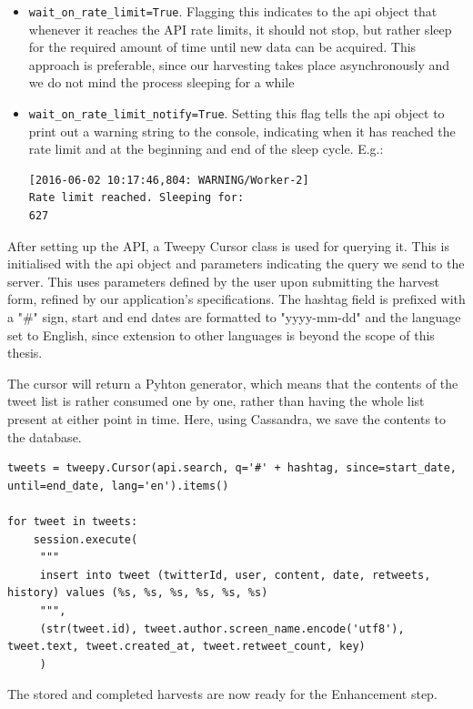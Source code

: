 \begin{itemize}
\item \texttt{wait\_on\_rate\_limit=True}. Flagging this indicates to the api object that whenever it reaches the API rate limits, it should not stop, but rather sleep for the required amount of time until new data can be acquired. This approach is preferable, since our harvesting takes place asynchronously and we do not mind the process sleeping for a while
\item \texttt{wait\_on\_rate\_limit\_notify=True}. Setting this flag tells the api object to print out a warning string to the console, indicating when it has reached the rate limit and at the beginning and end of the sleep cycle. E.g.:\lstset{basicstyle=\small}
\begin{lstlisting}
[2016-06-02 10:17:46,804: WARNING/Worker-2]
Rate limit reached. Sleeping for:
627
\end{lstlisting}
\end{itemize}

After setting up the API, a Tweepy Cursor class is used for querying it. This is initialised with the api object and parameters indicating the query we send to the server. This uses parameters defined by the user upon submitting the harvest form, refined by our application's specifications. The hashtag field is prefixed with a "\#" sign, start and end dates are formatted to "yyyy-mm-dd" and the language set to English, since extension to other languages is beyond the scope of this thesis.

The cursor will return a Pyhton generator, which means that the contents of the tweet list is rather consumed one by one, rather than having the whole list present at either point in time. Here, using Cassandra, we save the contents to the database.

\lstset{basicstyle=\small, breaklines=True}
\begin{lstlisting}
tweets = tweepy.Cursor(api.search, q='#' + hashtag, since=start_date, until=end_date, lang='en').items()

for tweet in tweets:
    session.execute(
     """
     insert into tweet (twitterId, user, content, date, retweets, history) values (%s, %s, %s, %s, %s, %s)
     """,
     (str(tweet.id), tweet.author.screen_name.encode('utf8'), tweet.text, tweet.created_at, tweet.retweet_count, key)
     )
\end{lstlisting}

The stored and completed harvests are now ready for the Enhancement step.

